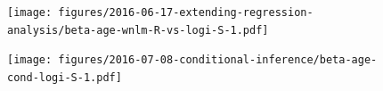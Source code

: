 \documentclass[letterpaper]{article}
\begin{document}
\begin{figure}
\begin{center}
\texttt{[image: figures/2016-06-17-extending-regression-analysis/beta-age-wnlm-R-vs-logi-S-1.pdf]}
\end{center}
\caption{}
\label{fig:age-effect-two-model}
\end{figure}

\begin{figure}
\begin{center}
\texttt{[image: figures/2016-07-08-conditional-inference/beta-age-cond-logi-S-1.pdf]}
\end{center}
\caption{}
\label{fig:interaction}
\end{figure}


\setcounter{table}{0}
\makeatletter 
\renewcommand{\thetable}{S\@arabic\c@table}
\makeatother
\end{document}
